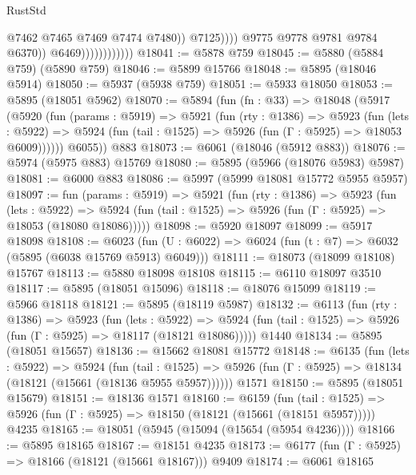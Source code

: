 \begin{lexlean}{RustStd}
\begin{coremodule}
{{                                            @7462
                                            @7465
                                            @7469
                                            @7474
                                            @7480))
                                        @7125))))
                                @9775
                                @9778
                                @9781
                                @9784
                                @6370))
                            @6469))))))))))))
@18041 := @5878 @759
@18045 := @5880 (@5884 @759) (@5890 @759)
@18046 := @5899 @15766
@18048 := @5895 (@18046 @5914)
@18050 := @5937 (@5938 @759)
@18051 := @5933 @18050
@18053 := @5895 (@18051 @5962)
@18070 := @5894
    (fun (fn : @33) =>
    @18048
      (@5917
        (@5920
          (fun (params : @5919) =>
          @5921
            (fun (rty : @1386) =>
            @5923
              (fun (lets : @5922) =>
              @5924 (fun (tail : @1525) => @5926 (fun (Γ : @5925) => @18053 @6009))))))
        @6055))
    @883
@18073 := @6061 (@18046 (@5912 @883))
@18076 := @5974 (@5975 @883) @15769
@18080 := @5895 (@5966 (@18076 @5983) @5987)
@18081 := @6000 @883
@18086 := @5997 (@5999 @18081 @15772 @5955 @5957)
@18097 := fun (params : @5919) =>
  @5921
    (fun (rty : @1386) =>
    @5923
      (fun (lets : @5922) =>
      @5924 (fun (tail : @1525) => @5926 (fun (Γ : @5925) => @18053 (@18080 @18086)))))
@18098 := @5920 @18097
@18099 := @5917 @18098
@18108 := @6023
    (fun (U : @6022) => @6024 (fun (t : @7) => @6032 (@5895 (@6038 @15769 @5913) @6049)))
@18111 := @18073 (@18099 @18108) @15767
@18113 := @5880 @18098 @18108
@18115 := @6110 @18097 @3510
@18117 := @5895 (@18051 @15096)
@18118 := @18076 @15099
@18119 := @5966 @18118
@18121 := @5895 (@18119 @5987)
@18132 := @6113
    (fun (rty : @1386) =>
    @5923
      (fun (lets : @5922) =>
      @5924 (fun (tail : @1525) => @5926 (fun (Γ : @5925) => @18117 (@18121 @18086)))))
    @1440
@18134 := @5895 (@18051 @15657)
@18136 := @15662 @18081 @15772
@18148 := @6135
    (fun (lets : @5922) =>
    @5924
      (fun (tail : @1525) =>
      @5926 (fun (Γ : @5925) => @18134 (@18121 (@15661 (@18136 @5955 @5957))))))
    @1571
@18150 := @5895 (@18051 @15679)
@18151 := @18136 @1571
@18160 := @6159
    (fun (tail : @1525) => @5926 (fun (Γ : @5925) => @18150 (@18121 (@15661 (@18151 @5957)))))
    @4235
@18165 := @18051 (@5945 (@15094 (@15654 (@5954 @4236))))
@18166 := @5895 @18165
@18167 := @18151 @4235
@18173 := @6177 (fun (Γ : @5925) => @18166 (@18121 (@15661 @18167))) @9409
@18174 := @6061 @18165
}}
\end{coremodule}
\end{lexlean}
